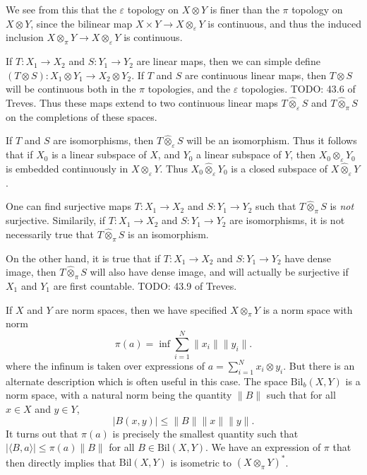 \begin{remark}
    We see from this that the $\varepsilon$ topology on $X \otimes Y$ is finer than the $\pi$ topology on$ X \otimes Y$, since the bilinear map $X \times Y \to X \otimes_\varepsilon Y$ is continuous, and thus the induced inclusion $X \otimes_\pi Y \to X \otimes_\varepsilon Y$ is continuous.
\end{remark}

If $T: X_1 \to X_2$ and $S: Y_1 \to Y_2$ are linear maps, then we can simple define $(T \otimes S): X_1 \otimes Y_1 \to X_2 \otimes Y_2$. If $T$ and $S$ are continuous linear maps, then $T \otimes S$ will be continuous both in the $\pi$ topologies, and the $\varepsilon$ topologies. TODO: 43.6 of Treves. Thus these maps extend to two continuous linear maps $T \widehat{\otimes}_\varepsilon S$ and $T \widehat{\otimes}_\pi S$ on the completions of these spaces.

If $T$ and $S$ are isomorphisms, then $T \widehat{\otimes}_\varepsilon S$ will be an isomorphism. Thus it follows that if $X_0$ is a linear subspace of $X$, and $Y_0$ a linear subspace of $Y$, then $X_0 \otimes_\varepsilon Y_0$ is embedded continuously in $X \otimes_\varepsilon Y$. Thus $X_0 \widehat{\otimes}_\varepsilon Y_0$ is a closed subspace of $X \widehat{\otimes}_\varepsilon Y$.

\begin{remark}
    One can find surjective maps $T: X_1 \to X_2$ and $S: Y_1 \to Y_2$ such that $T \widehat{\otimes}_\pi S$ is \emph{not} surjective. Similarily, if $T: X_1 \to X_2$ and $S: Y_1 \to Y_2$ are isomorphisms, it is not necessarily true that $T \widehat{\otimes}_\pi S$ is an isomorphism.
\end{remark}

On the other hand, it is true that if $T: X_1 \to X_2$ and $S: Y_1 \to Y_2$ have dense image, then $T \widehat{\otimes}_\pi S$ will also have dense image, and will actually be surjective if $X_1$ and $Y_1$ are first countable. TODO: 43.9 of Treves.

If $X$ and $Y$ are norm spaces, then we have specified $X \otimes_\pi Y$ is a norm space with norm
%
\[ \pi(a) = \inf \sum_{i = 1}^N \| x_i \| \| y_i \|. \]
%
where the infinum is taken over expressions of $a = \sum_{i = 1}^N x_i \otimes y_i$. But there is an alternate description which is often useful in this case. The space $\text{Bil}_b(X,Y)$ is a norm space, with a natural norm being the quantity $\| B \|$ such that for all $x \in X$ and $y \in Y$,
%
\[ |B(x,y)| \leq \| B \| \| x \| \| y \|. \]
%
It turns out that $\pi(a)$ is precisely the smallest quantity such that $|\langle B, a \rangle| \leq \pi(a) \| B \|$ for all $B \in \text{Bil}(X,Y)$. We have an expression of $\pi$ that then directly implies that $\text{Bil}(X,Y)$ is isometric to $(X \otimes_\pi Y)^*$.

